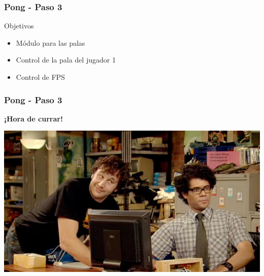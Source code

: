 \begin{frame}
	\frametitle{Pong - Paso 3}
	
	\begin{block}{Objetivos}
		\begin{itemize}
			\item Módulo para las palas
			\item Control de la pala del jugador 1
			\item Control de FPS
		\end{itemize}            
	\end{block}

\end{frame}

\begin{frame}
	\frametitle{Pong - Paso 3}
	
    \begin{center}
        \textbf{¡Hora de currar!}
    \end{center}
	
    \begin{center}
		\includegraphics[scale=0.4]{img/currar-6.png}
	\end{center}	

\end{frame}

